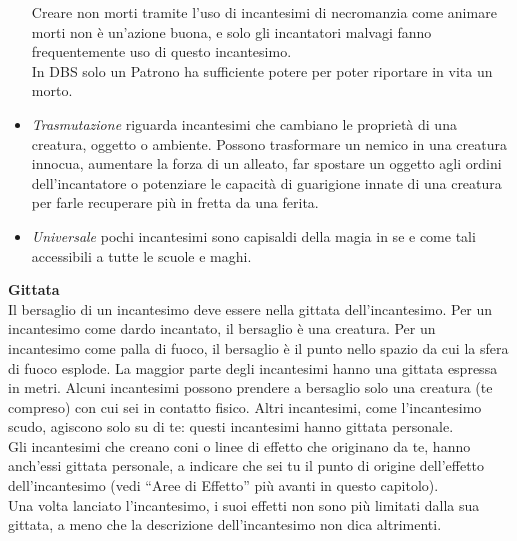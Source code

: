 \begin{itemize}
Creare non morti tramite l’uso di incantesimi di necromanzia come animare morti non è un'azione buona, e solo gli incantatori malvagi fanno frequentemente uso di questo incantesimo.\\
In DBS solo un Patrono ha sufficiente potere per poter riportare in vita un morto.\\
\item
\textit{Trasmutazione} riguarda incantesimi che cambiano le proprietà di una creatura, oggetto o ambiente. Possono trasformare un  nemico in una creatura innocua, aumentare la forza di un alleato,  far spostare un oggetto agli ordini dell'incantatore o potenziare le  capacità di guarigione innate di una creatura per farle recuperare  più in fretta da una ferita.\\
\item
\textit{Universale} pochi incantesimi sono capisaldi della magia in se e come tali accessibili a tutte le scuole e maghi.


\end{itemize}

\textbf{Gittata}\\
Il bersaglio di un incantesimo deve essere nella gittata dell'incantesimo. Per un incantesimo come dardo  incantato, il bersaglio è una creatura. Per un incantesimo come palla di fuoco, il bersaglio è il punto  nello spazio da cui la sfera di fuoco esplode. La maggior parte degli incantesimi hanno una gittata espressa in metri. Alcuni incantesimi possono prendere a bersaglio solo una creatura (te compreso) con cui sei  in contatto fisico. Altri incantesimi, come l'incantesimo  scudo, agiscono solo su di te: questi incantesimi hanno  gittata personale.
\\
Gli incantesimi che creano coni o linee di effetto che originano da te, hanno anch’essi gittata personale, a indicare che sei tu il punto di origine dell'effetto dell'incantesimo (vedi “Aree di Effetto” più avanti in questo capitolo).\\

Una volta lanciato l'incantesimo, i suoi effetti non sono più limitati dalla sua gittata, a meno che la descrizione  dell'incantesimo non dica altrimenti.\\

